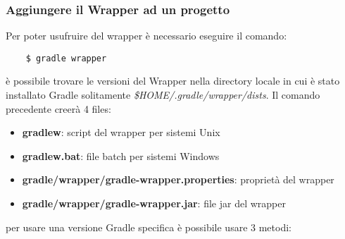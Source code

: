 \subsubsection{Aggiungere il Wrapper ad un progetto}
Per poter usufruire del wrapper è necessario eseguire il comando:
\begin{verbatim}
    $ gradle wrapper \end{verbatim}
è possibile trovare le versioni del Wrapper nella directory locale in cui è stato installato Gradle solitamente \textit{\$HOME/.gradle/wrapper/dists}. Il comando precedente creerà 4 files:
\begin{itemize}
    \item \textbf{gradlew}: script del wrapper per sistemi Unix
    \item \textbf{gradlew.bat}: file batch per sistemi Windows
    \item \textbf{gradle/wrapper/gradle-wrapper.properties}: proprietà del wrapper
    \item \textbf{gradle/wrapper/gradle-wrapper.jar}: file jar del wrapper
\end{itemize}
per usare una versione Gradle specifica è possibile usare 3 metodi:
